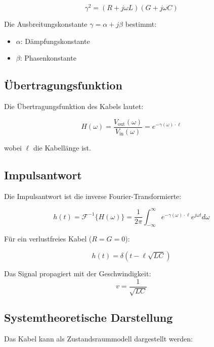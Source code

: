 ﻿\documentclass[12pt,a4paper]{article}
\theoremstyle{definition}
\theoremstyle{remark}
\begin{document}
\begin{equation}
\gamma^2 = (R + j\omega L)(G + j\omega C)
\end{equation}

Die Ausbreitungskonstante $\gamma = \alpha + j\beta$ bestimmt:
\begin{itemize}
\item $\alpha$: Dämpfungskonstante
\item $\beta$: Phasenkonstante
\end{itemize}

\subsection{Übertragungsfunktion}

Die Übertragungsfunktion des Kabels lautet:

\begin{equation}
H(\omega) = \frac{V_{\text{out}}(\omega)}{V_{\text{in}}(\omega)} = e^{-\gamma(\omega) \cdot \ell}
\end{equation}

wobei $\ell$ die Kabellänge ist.

\subsection{Impulsantwort}

Die Impulsantwort ist die inverse Fourier-Transformierte:

\begin{equation}
h(t) = \mathcal{F}^{-1}\{H(\omega)\} = \frac{1}{2\pi} \int_{-\infty}^{\infty} e^{-\gamma(\omega) \cdot \ell} e^{j\omega t} d\omega
\end{equation}

Für ein verlustfreies Kabel ($R = G = 0$):

\begin{equation}
h(t) = \delta\left(t - \ell\sqrt{LC}\right)
\end{equation}

Das Signal propagiert mit der Geschwindigkeit:
\begin{equation}
v = \frac{1}{\sqrt{LC}}
\end{equation}

\subsection{Systemtheoretische Darstellung}

Das Kabel kann als Zustandsraummodell dargestellt werden:
\end{document}
